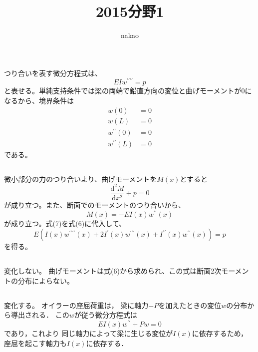 \documentclass[a4paper]{jsarticle}
\begin{document}
\title{2015分野1}
\author{nakao}
\maketitle

\section{}
\subsection{}
つり合いを表す微分方程式は、
\begin{equation}
  E I w^{\prime \prime \prime \prime} = p
\end{equation}
と表せる。単純支持条件では梁の両端で鉛直方向の変位と曲げモーメントが0になるから、境界条件は
\begin{align}
  w(0)                 & = 0 \\
  w(L)                 & = 0 \\
  w^{\prime \prime}(0) & = 0 \\
  w^{\prime \prime}(L) & = 0
\end{align}
である。

\subsection{}
微小部分の力のつり合いより、曲げモーメントを$M(x)$とすると
\begin{equation}
  \frac{\mathrm{d}^2 M}{\mathrm{d} x^2} + p = 0
\end{equation}
が成り立つ。また、断面でのモーメントのつり合いから、
\begin{equation}
  M(x) = -E I(x) w^{\prime \prime}(x)
\end{equation}
が成り立つ。式(7)を式(6)に代入して、
\begin{equation}
  E \left(I(x) w^{\prime \prime \prime \prime}(x) +
  2 I^{\prime}(x) w^{\prime \prime \prime}(x) +
  I^{\prime \prime}(x) w^{\prime \prime}(x)\right)
  = p
\end{equation}
を得る。

\subsection{}
変化しない。
曲げモーメントは式(6)から求められ、この式は断面2次モーメントの分布によらない。

\subsection{}
変化する。
オイラーの座屈荷重は，
梁に軸力$-P$を加えたときの変位$w$の分布から導出される．
この$w$が従う微分方程式は
\begin{equation}
  E I(x) w^{\prime \prime} + P w = 0
\end{equation}
であり，これより
同じ軸力によって梁に生じる変位が$I(x)$に依存するため，
座屈を起こす軸力も$I(x)$に依存する．
\end{document}
